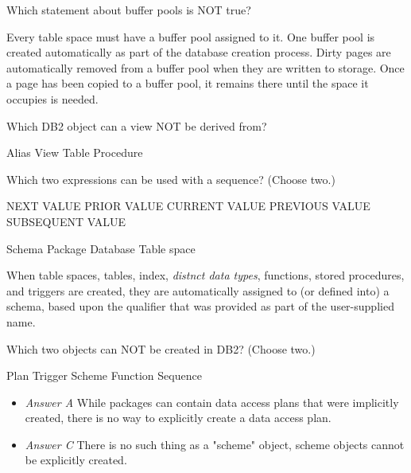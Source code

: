 \documentclass[answers, 11pt]{exam}
\begin{document}
\begin{questions}
\question[1]
Which statement about buffer pools is NOT true?
\begin{choices}
	\choice Every table space must have a buffer pool assigned to it.
	\choice One buffer pool is created automatically as part of the database creation process.
	\CorrectChoice Dirty pages are automatically removed from a buffer pool when they are written to storage.
	\choice Once a page has been copied to a buffer pool, it remains there until the space it occupies is 
	needed.
\end{choices}

\question[1]
Which DB2 object can a view NOT be derived from?
\begin{choices}
	\choice Alias
	\choice View
	\choice Table
	\CorrectChoice Procedure
\end{choices}

\question[1]
Which two expressions can be used with a sequence? (Choose two.)
\begin{choices}
	\CorrectChoice NEXT VALUE
	\choice PRIOR VALUE
	\choice CURRENT VALUE
	\CorrectChoice PREVIOUS VALUE
	\choice SUBSEQUENT VALUE
\end{choices}

\newpage
{}
\begin{choices}
	\CorrectChoice Schema
	\choice Package
	\choice Database
	\choice Table space
\end{choices}

\begin{solution}
	When table spaces, tables, index, \textit{distnct data types}, functions, stored procedures, and triggers are created, they are
	automatically assigned to (or defined into) a schema, based upon the qualifier that was provided as part of the user-supplied name.
\end{solution}

\question[1]
Which two objects can NOT be created in DB2? (Choose two.)
\begin{choices}
	\CorrectChoice Plan
	\choice Trigger
	\CorrectChoice Scheme
	\choice Function
	\choice Sequence
\end{choices}

\begin{solution}
	\begin{itemize}
		\item \textit{Answer A} While packages can contain data access plans that were implicitly created, there is no way to explicitly create a 
		data access plan.
		\item \textit{Answer C} There is no such thing as a "scheme" object, scheme objects cannot be explicitly created.
	\end{itemize}
\end{solution}


\end{questions}
\end{document}
